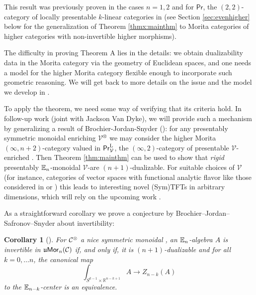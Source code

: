 \documentclass[10pt, reqno, twoside
, final
]{amsart}
\numberwithin{equation}{subsection}%
\newtheorem{corx}{Corollary}
\theoremstyle{definition}
\theoremstyle{definition}
\theoremstyle{definition}
\theoremstyle{definition}
\theoremstyle{definition}
\theoremstyle{definition}
\theoremstyle{definition}
\theoremstyle{definition}
\theoremstyle{definition}
\theoremstyle{plain}
\theoremstyle{definition}
\theoremstyle{plain}
\theoremstyle{definition}
\theoremstyle{plain}
\theoremstyle{definition}
\theoremstyle{definition}
\theoremstyle{plain}
\theoremstyle{plain}
\theoremstyle{definition}
\theoremstyle{plain}
\theoremstyle{plain}
\theoremstyle{plain}
\begin{document}
This result was previously proven in the cases $n=1,2$ and for $\mathsf{Pr}$, the  $(2,2)$-category of locally presentable $k$-linear categories in \cite{BJS} (see Section \ref{sec:evenhigher} below for the generalization of Theorem \ref{thmx:mainthm} to Morita categories of higher categories with non-invertible higher morphisms).

The difficulty in proving  Theorem A lies in the details: we obtain dualizability data in the Morita category via the geometry of Euclidean spaces, and one needs a model for the higher Morita category flexible enough to incorporate such geometric reasoning. We will get back to more details on the issue and the model we develop in .


To apply the theorem, we need some way of verifying that its criteria hold. In follow-up work (joint with Jackson Van Dyke), we will provide such a mechanism by generalizing a result of Brochier-Jordan-Snyder (\cite[Theorem 5.16]{BJS}): for any presentably symmetric monoidal enriching \infcat $\mathcal{V}^{\otimes}$ we may consider the higher Morita $(\infty,n+2)$-category valued in $\mathsf{Pr}^{\mathrm{L}}_{\mathcal{V}}$, the $(\infty,2)$-category of presentable $\mathcal{V}$-enriched \infcatst. Then Theorem \ref{thm:mainthm} can be used to show that \emph{rigid} presentably $\mathbb{E}_n$-monoidal $\mathcal{V}$-\infcats are $(n+1)$-dualizable. For suitable choices of $\mathcal{V}$ (for instance, categories of vector spaces with functional analytic flavor like those considered in \cite{BenBasKelKrem} or \cite{ClauScholze}) this leads to interesting novel (Sym)TFTs in arbitrary dimensions, which will rely on the upcoming work \cite{Steffens}. 



As a straightforward corollary we prove a conjecture by Brochier--Jordan--Safronov--Snyder \cite{BJSS} about invertibility:
\begin{corx}[]
For $\mathcal{C}^{\otimes}$ a nice symmetric monoidal \infcatt, an $\mathbb{E}_n$-algebra $A$ is invertible in $\mathfrak{u}\mathsf{Mor}_n(\mathcal{C})$ if, and only if, it is $(n+1)$-dualizable and for all $k=0,\ldots n$, the canonical map
\[\int_{S^{k-1}\times \mathbb{R}^{n-k+1}} A \longrightarrow Z_{n-k}(A)\]
to the \emph{$\mathbb{E}_{n-k}$-center} is an equivalence.
\end{corx}
\end{document}

